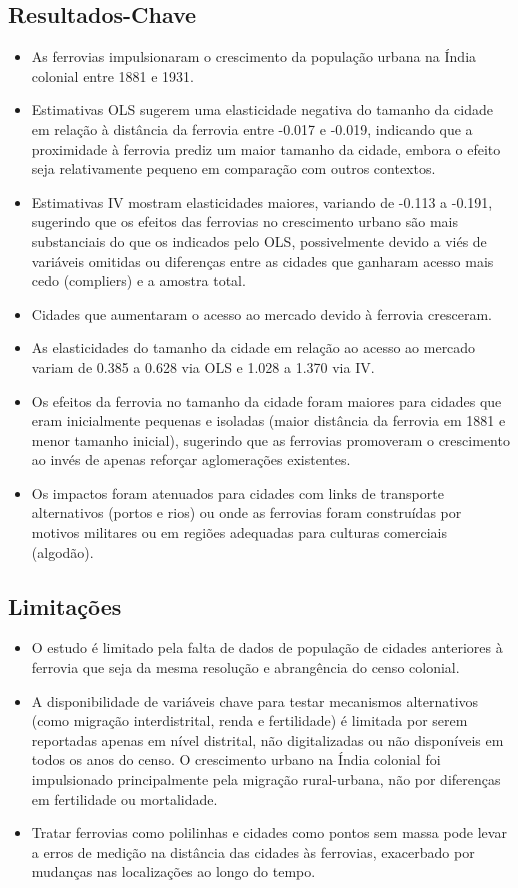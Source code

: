 \documentclass[12pt]{article}
\begin{document}
\subsection*{Resultados-Chave}
\begin{itemize}
    \item As ferrovias impulsionaram o crescimento da população urbana na Índia colonial entre 1881 e 1931.
    \item Estimativas OLS sugerem uma elasticidade negativa do tamanho da cidade em relação à distância da ferrovia entre -0.017 e -0.019, indicando que a proximidade à ferrovia prediz um maior tamanho da cidade, embora o efeito seja relativamente pequeno em comparação com outros contextos.
    \item Estimativas IV mostram elasticidades maiores, variando de -0.113 a -0.191, sugerindo que os efeitos das ferrovias no crescimento urbano são mais substanciais do que os indicados pelo OLS, possivelmente devido a viés de variáveis omitidas ou diferenças entre as cidades que ganharam acesso mais cedo (compliers) e a amostra total.
    \item Cidades que aumentaram o acesso ao mercado devido à ferrovia cresceram.
    \item As elasticidades do tamanho da cidade em relação ao acesso ao mercado variam de 0.385 a 0.628 via OLS e 1.028 a 1.370 via IV.
    \item Os efeitos da ferrovia no tamanho da cidade foram maiores para cidades que eram inicialmente pequenas e isoladas (maior distância da ferrovia em 1881 e menor tamanho inicial), sugerindo que as ferrovias promoveram o crescimento ao invés de apenas reforçar aglomerações existentes.
    \item Os impactos foram atenuados para cidades com links de transporte alternativos (portos e rios) ou onde as ferrovias foram construídas por motivos militares ou em regiões adequadas para culturas comerciais (algodão).
\end{itemize}

\subsection*{Limitações}
\begin{itemize}
    \item O estudo é limitado pela falta de dados de população de cidades anteriores à ferrovia que seja da mesma resolução e abrangência do censo colonial.
    \item A disponibilidade de variáveis chave para testar mecanismos alternativos (como migração interdistrital, renda e fertilidade) é limitada por serem reportadas apenas em nível distrital, não digitalizadas ou não disponíveis em todos os anos do censo. O crescimento urbano na Índia colonial foi impulsionado principalmente pela migração rural-urbana, não por diferenças em fertilidade ou mortalidade.
    \item Tratar ferrovias como polilinhas e cidades como pontos sem massa pode levar a erros de medição na distância das cidades às ferrovias, exacerbado por mudanças nas localizações ao longo do tempo.
\end{itemize}
\end{document}
